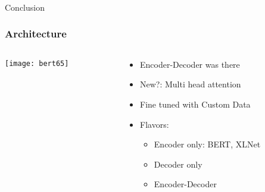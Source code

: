 \begin{frame}[fragile]\frametitle{}
\begin{center}
{\Large Conclusion}
\end{center}
\end{frame}


\begin{frame}[fragile]\frametitle{Architecture}

\begin{columns}
    \begin{column}[T]{0.5\linewidth}
			\begin{center}
			\texttt{[image: bert65]}
			\end{center}		
		\end{column}
    \begin{column}[T]{0.5\linewidth}
      \begin{itemize}
			\item Encoder-Decoder was there
			\item New?: Multi head attention
			\item Fine tuned with Custom Data
			\item Flavors:
      \begin{itemize}
			\item Encoder only: BERT, XLNet
			\item Decoder only
			\item Encoder-Decoder
			\end{itemize}
			\end{itemize}
    \end{column}
  \end{columns}
			
\end{frame}

